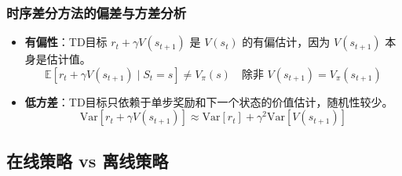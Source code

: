 \subsubsection{时序差分方法的偏差与方差分析}
\begin{itemize}
    \item \textbf{有偏性}：TD目标 $r_t + \gamma V(s_{t+1})$ 是 $V(s_t)$ 的有偏估计，因为 $V(s_{t+1})$ 本身是估计值。
    \[
    \mathbb{E}[r_t + \gamma V(s_{t+1}) \mid S_t = s] \neq V_\pi(s) \quad \text{除非 } V(s_{t+1}) = V_\pi(s_{t+1})
    \]
    
    \item \textbf{低方差}：TD目标只依赖于单步奖励和下一个状态的价值估计，随机性较少。
    \[
    \text{Var}[r_t + \gamma V(s_{t+1})] \approx \text{Var}[r_t] + \gamma^2 \text{Var}[V(s_{t+1})]
    \]
\end{itemize}

\subsection{在线策略 vs 离线策略}

